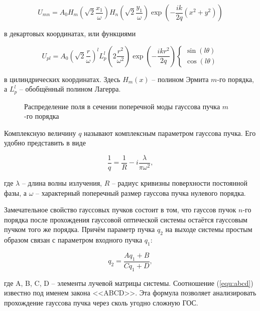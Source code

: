 \documentclass[a4paper,12pt]{article}
\begin{document}
\begin{equation}
    U_{mn} = A_0 H_m (\sqrt{2} \frac{x_1}{\omega}) H_n (\sqrt{2} \frac{y_1}{\omega}) \exp{(-\frac{ik}{2q}(x^2+y^2))}
    \label{equ:gauss_decartes}
\end{equation}

в декартовых координатах, или функциями

\begin{equation}
    U_{pl} = A_0(\sqrt{2}\frac{r}{\omega})^{l} L_p^l (2\frac{r^2}{\omega^2})\exp{(-\frac{ikr^2}{2q})}
    \begin{cases}
    \sin(l\theta)\\
    \cos(l\theta)
    \end{cases}
    \label{equ:gauss_cylinder}
\end{equation}

в цилиндрических координатах. Здесь $H_m(x)$ -- полином Эрмита $m$-го порядка, а $L_p^l$ -- обобщённый полином Лагерра.

\begin{figure}[h!]
    \caption{Распределение поля в сечении поперечной моды гауссова пучка $m$-го порядка}
    \label{fig:mode_form}
\end{figure}

Комплексную величину $q$ называют комплексным параметром гауссова пучка. Его удобно представить в виде

\begin{equation}
    \frac{1}{q} = \frac{1}{R} - i\frac{\lambda}{\pi\omega^2},
    \label{equ:form}
\end{equation}

где $\lambda$ -- длина волны излучения, $R$ -- радиус кривизны поверхности постоянной фазы, а $\omega$ -- характерный поперечный размер гауссова пучка нулевого порядка.

Замечательное свойство гауссовых пучков состоит в том, что гауссов пучок $n$-го порядка после прохождения гауссовой оптической системы остаётся гауссовым пучком того же порядка. Причём параметр пучка $q_2$ на выходе системы простым образом связан с параметром входного пучка $q_1$:

\begin{equation}
    q_2 = \frac{Aq_1 + B}{Cq_1 + D},
    \label{equ:abcd}
\end{equation}

где A, B, C, D -- элементы лучевой матрицы системы. Соотношение (\ref{equ:abcd}) известно под именем закона <<ABCD>>. Эта формула позволяет анализировать прохождение гауссова пучка через сколь угодно сложную ГОС.
\end{document}
